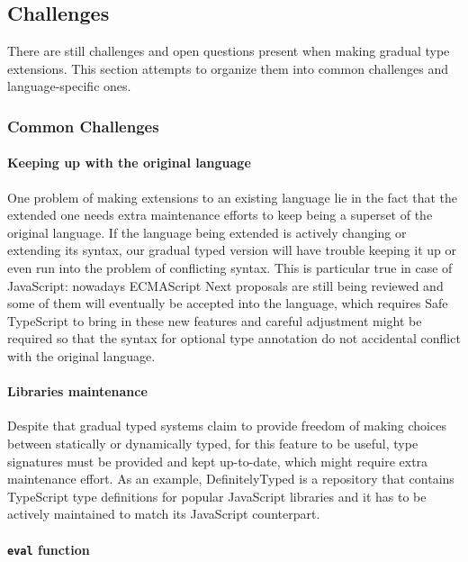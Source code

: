 \subsection{Challenges}

There are still challenges and open questions present when
making gradual type extensions. This section attempts to
organize them into common challenges and language-specific ones.

\subsubsection{Common Challenges}

\paragraph{Keeping up with the original language}
One problem of making extensions to an existing language
lie in the fact that the extended one needs extra maintenance efforts to keep being
a superset of the original language.
If the language being extended is actively changing or extending its syntax,
our gradual typed version will have trouble keeping it up or
even run into the problem of conflicting syntax.
This is particular true in case of JavaScript: nowadays ECMAScript Next
proposals are still being reviewed and some of them will eventually
be accepted into the language,
which requires Safe TypeScript to bring in these new features
and careful adjustment might be required so that the syntax for
optional type annotation do not accidental conflict with the original language.

\paragraph{Libraries maintenance}
Despite that gradual typed systems claim to provide freedom of making choices
between statically or dynamically typed,
for this feature to be useful, type signatures must be provided
and kept up-to-date, which might require extra maintenance effort.
As an example, DefinitelyTyped\cite{yankov2014definitelytyped}
is a repository that contains TypeScript type definitions for popular
JavaScript libraries and it has to be actively maintained to
match its JavaScript counterpart.

\paragraph{\texttt{eval} function}

